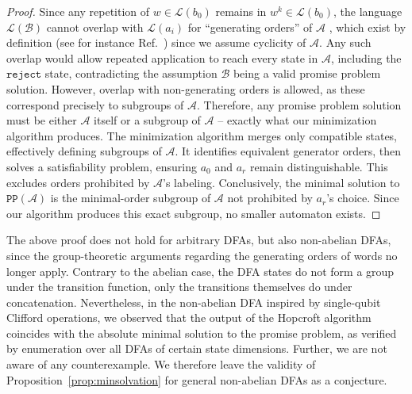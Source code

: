 \documentclass[../main.tex]{subfiles}
\begin{document}
\begin{proof}
    Since any repetition of $w \in \mathcal{L}(b_0)$ remains in $ w^k \in \mathcal{L}(b_0)$, the language $\mathcal{L}(\mathcal{B})$ cannot overlap with $\mathcal{L}(a_i)$ for ``generating orders'' of $\mathcal{A}$ , which exist by definition (see for instance Ref.~\cite{lang2012algebra}) since we assume cyclicity of $\mathcal{A}$. Any such overlap would allow repeated application to reach every state in $\mathcal{A}$, including the $\mathtt{reject}$  state, contradicting the assumption $\mathcal{B}$ being a valid promise problem solution.
    However, overlap with non-generating orders is allowed, as these correspond precisely to subgroups of $\mathcal{A}$. Therefore, any promise problem solution must be either $\mathcal{A}$ itself or a subgroup of $\mathcal{A}$ -- exactly what our minimization algorithm produces.
    The minimization algorithm merges only compatible states, effectively defining subgroups of $\mathcal{A}$. It identifies equivalent generator orders, then solves a satisfiability problem, ensuring $a_0$ and $a_r$ remain distinguishable. This excludes orders prohibited by $\mathcal{A}$'s labeling.
    Conclusively, the minimal solution to $\mathtt{PP}(\mathcal{A})$ is the minimal-order subgroup of $\mathcal{A}$ not prohibited by $a_r$'s choice. Since our algorithm produces this exact subgroup, no smaller automaton exists. 
\end{proof}

The above proof does not hold for arbitrary DFAs, but also non-abelian DFAs, since the group-theoretic arguments regarding the generating orders of words no longer apply. Contrary to the abelian case, the DFA states do not form a group under the transition function, only the transitions themselves do under concatenation. Nevertheless, in the non-abelian DFA inspired by single-qubit Clifford operations, we observed that the output of the Hopcroft algorithm coincides with the absolute minimal solution to the promise problem, as verified by enumeration over all DFAs of certain state dimensions. Further, we are not aware of any counterexample. We therefore leave the validity of Proposition~\ref{prop:minsolvation} for general non-abelian DFAs as a conjecture.
\end{document}
